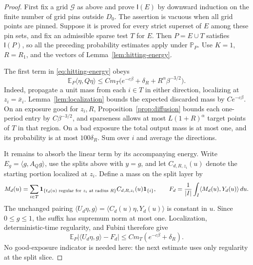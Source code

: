 \begin{proof}
First fix a grid \(\mathcal G\) as above and prove
\(\mathsf I(E)\) by downward induction on the finite number
of grid pins outside \(D_0\).  The assertion is vacuous when
all grid points are pinned.  Suppose it is proved for every
strict superset of \(E\) among these pin sets, and fix an
admissible sparse test \(T\) for \(E\).  Then
\(P=E\cup T\) satisfies \(\mathsf I(P)\), so all the preceding
probability estimates apply under \(\mathbb P_P\).
Use \(K=1\), \(R=R_1\), and the vectors of
Lemma~\ref{lem:hitting-energy}.

The first term in \eqref{eq:hitting-energy} obeys
\begin{equation}\label{eq:bootstrap-short-return}
 \mathbb E_P\langle\eta,Q\eta\rangle
 \le Cm_T\bigl(e^{-c\beta}+\delta_R
                       +R^\alpha\beta^{-3/2}\bigr).
\end{equation}
Indeed, propagate a unit mass from each \(i\in T\) in either
direction, localizing at \(z_i=\bar x_i\).  Lemma~\ref{lem:localization}
bounds the expected discarded mass by \(Ce^{-c\beta}\).
On an exposure good for \(z_i,R\), Proposition~\ref{prop:diffusion}
bounds each one-period entry by \(C\beta^{-3/2}\), and
sparseness allows at most \(L(1+R)^\alpha\) target points of
\(T\) in that region.  On a bad exposure the total output
mass is at most one, and its probability is at most \(100\delta_R\).
Sum over \(i\) and average the directions.

It remains to absorb the linear term by its accompanying energy.
Write \(E_g=\langle g,A_Qg\rangle\), use the splits above with
\(y=g\), and let \(C_{d,R,z_i}(u)\) denote the starting
portion localized at \(z_i\).  Define a mass on the split layer by
\[
 M_d(u)=\sum_{i\in T}
  \mathbf1_{\{t_d(u)\text{ regular for }z_i\text{ at radius }R\}}
  C_{d,R,z_i}(u)\mathbf1_{\{i\}},
 \qquad
 F_d=\frac1{|I|}\int_I\langle M_d(u),Y_d(u)\rangle\,du.
\]
The unchanged pairing
\(\langle U_d\eta,g\rangle
=\langle C_d(u)\eta,Y_d(u)\rangle\) is constant in \(u\).
Since \(0\le g\le1\), the suffix has supremum norm at most one.
Localization, deterministic-time regularity, and Fubini therefore give
\begin{equation}\label{eq:bootstrap-pairing-error}
 \mathbb E_P\bigl|\langle U_d\eta,g\rangle-F_d\bigr|
 \le Cm_T(e^{-c\beta}+\delta_R).
\end{equation}
No good-exposure indicator is needed here: the next estimate uses
only regularity at the split slice.


\end{proof}
